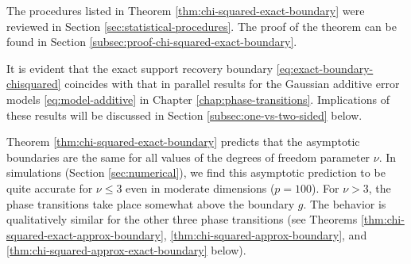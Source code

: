 

The procedures listed in Theorem \ref{thm:chi-squared-exact-boundary} were reviewed in Section \ref{sec:statistical-procedures}. 
The proof of the theorem can be found in Section \ref{subsec:proof-chi-squared-exact-boundary}. 

It is evident that the exact support recovery boundary \eqref{eq:exact-boundary-chisquared} coincides with that in parallel results for the Gaussian additive error models \eqref{eq:model-additive} in Chapter \ref{chap:phase-transitions}.
Implications of these results will be discussed in Section \ref{subsec:one-vs-two-sided} below.

\begin{remark} \label{rmk:strong-classification-boundary-2}
Theorem \ref{thm:chi-squared-exact-boundary} predicts that the asymptotic boundaries are the same for all values of the degrees of freedom 
parameter $\nu$.  In simulations (Section \ref{sec:numerical}), we find this asymptotic prediction to be quite accurate for $\nu\le3$ even in 
moderate dimensions ($p=100$).  For $\nu>3$, the phase transitions take place somewhat above the boundary ${g}$.
The behavior is qualitatively similar for the other three phase transitions (see Theorems \ref{thm:chi-squared-exact-approx-boundary}, 
\ref{thm:chi-squared-approx-boundary}, and \ref{thm:chi-squared-approx-exact-boundary} below).
\end{remark}

